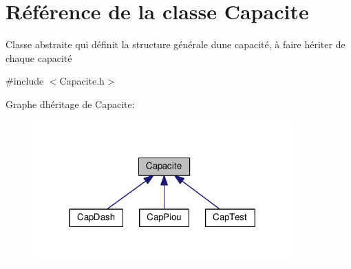 \hypertarget{class_capacite}{}\section{Référence de la classe Capacite}
\label{class_capacite}


Classe abstraite qui définit la structure générale d\textquotesingle{}une capacité, à faire hériter de chaque capacité  




{\ttfamily \#include $<$Capacite.\+h$>$}



Graphe d\textquotesingle{}héritage de Capacite\+:
\nopagebreak
\begin{figure}[H]
\begin{center}
\leavevmode
\includegraphics[width=282pt]{class_capacite__inherit__graph}
\end{center}
\end{figure}
